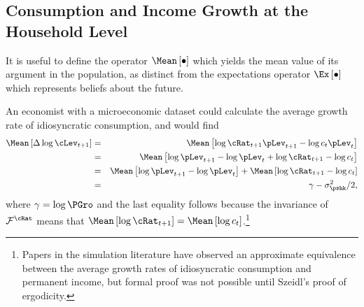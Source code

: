 \documentclass[titlepage]{\econtex}\providecommand{\texname}{BufferStockTheory}%
\begin{document}
\subsection{Consumption and Income Growth at the Household Level}

It is useful to define the operator $\Mean\left[\bullet\right]$
which yields the mean value of its argument in the population, as
distinct from the expectations operator $\Ex\left[\bullet\right]$ which represents beliefs about the
future.

An economist with a microeconomic dataset could calculate the average
growth rate of idiosyncratic consumption, and would find
\begin{eqnarray*}
\Mean\left[\Delta \log \cLev_{t+1}\right] & = & \Mean\left[ \log {\cRat}%
_{t+1}\pLev_{t+1} - \log c_{t}\pLev_{t}\right]  \notag \\
& = & \Mean\left[ \log \pLev_{t+1}- \log \pLev_{t} + \log {\cRat}_{t+1} - \log c_{t}\right]  \notag \\
& = & \Mean\left[ \log \pLev_{t+1}- \log \pLev_{t}\right] + \Mean\left[ \log {\cRat}_{t+1} - \log c_{t}\right]  \notag \\
& = & \gamma - \sigma^{2}_{\pshk}/2,
\end{eqnarray*}
where $\gamma=\log \PGro$ and the last equality follows because the invariance of
$\mathcal{F}^{\cRat}$ means that $\Mean\left[ \log
  {\cRat}_{t+1}\right] = \Mean\left[ \log
  c_{t}\right]$.\footnote{Papers in the simulation literature have
  observed an approximate equivalence between the average growth rates
  of idiosyncratic consumption and permanent income, but formal proof
  was not possible until Szeidl's proof of ergodicity.}
\end{document}
